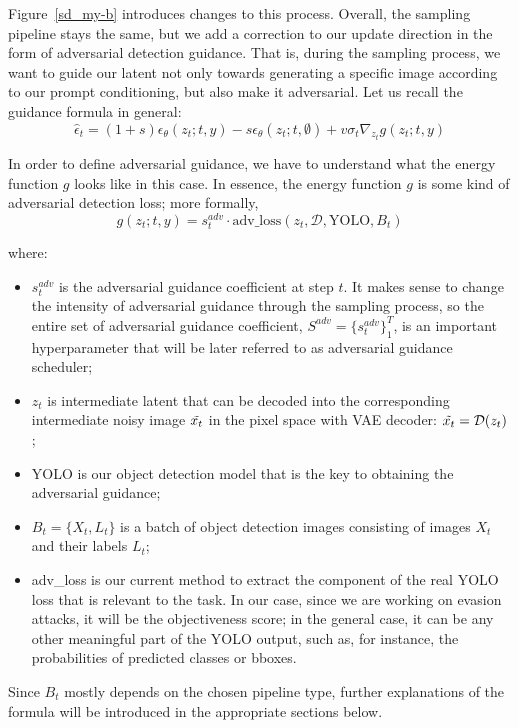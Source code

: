 Figure~\ref{sd_my-b} introduces changes to this process.
Overall, the sampling pipeline stays the same, but we add a correction to our update direction in the form of adversarial detection guidance. 
That is, during the sampling process, we want to guide our latent not only towards generating a specific image according to our prompt conditioning, but also make it adversarial. 
Let us recall the guidance formula in general: 
$$\hat\epsilon_t = (1+s)\epsilon_\theta(z_t;t,y) - s\epsilon_\theta(z_t;t,\emptyset) + v\sigma_t\nabla_{z_t}g(z_t; t, y)$$

In order to define adversarial guidance, we have to understand what the energy function $g$ looks like in this case.
In essence, the energy function $g$ is some kind of adversarial detection loss; more formally, 
$$g(z_t; t, y) = s^{adv}_t \cdot \text{adv\_loss}(z_t, \mathcal{D}, \text{YOLO}, B_t)$$

where:

\begin{itemize}
    \item $s^{adv}_t$ is the adversarial guidance coefficient at step $t$. 
    It makes sense to change the intensity of adversarial guidance through the sampling process, so the entire set of adversarial guidance coefficient, $S^{adv} = \{s^{adv}_t\}^T_1$, is an important hyperparameter that will be later referred to as adversarial guidance scheduler;
    \item $z_t$ is intermediate latent that can be decoded into the corresponding intermediate noisy image $\Tilde{x_t}$ in the pixel space with VAE decoder: $\Tilde{x_t} = \mathcal{D}(z_t)$; 
    \item YOLO is our object detection model that is the key to obtaining the adversarial guidance; 
    \item $B_t = \{X_t, L_t\}$ is a batch of object detection images consisting of images $X_t$ and their labels $L_t$; 
    \item adv\_loss is our current method to extract the component of the real YOLO loss that is relevant to the task. 
    In our case, since we are working on evasion attacks, it will be the objectiveness score; in the general case, it can be any other meaningful part of the YOLO output, such as, for instance, the probabilities of predicted classes or bboxes.
\end{itemize}

Since $B_t$ mostly depends on the chosen pipeline type, further explanations of the formula will be introduced in the appropriate sections below.

